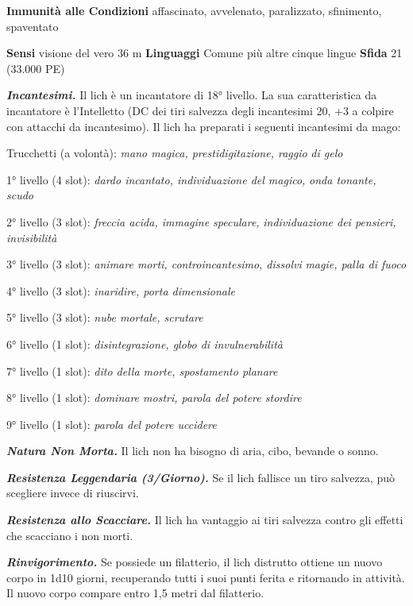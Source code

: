 \begin{multicols}{2}
\textbf{Immunità alle Condizioni} affascinato, avvelenato, paralizzato,
sfinimento, spaventato

\textbf{Sensi} visione del vero 36 m
\textbf{Linguaggi} Comune più altre cinque lingue \textbf{Sfida} 21
(33.000 PE)

\emph{\textbf{Incantesimi.}} Il lich è un incantatore di 18° livello. La
sua caratteristica da incantatore è l'Intelletto (DC dei tiri salvezza
degli incantesimi 20, +3 a colpire con attacchi da incantesimo). Il lich
ha preparati i seguenti incantesimi da mago:

Trucchetti (a volontà): \emph{mano magica, prestidigitazione, raggio}
\emph{di gelo}

1° livello (4 slot): \emph{dardo incantato, individuazione del magico,}
\emph{onda tonante, scudo}

2° livello (3 slot): \emph{freccia acida, immagine speculare,}
\emph{individuazione dei pensieri, invisibilità}

3° livello (3 slot): \emph{animare morti, controincantesimo, dissolvi}
\emph{magie, palla di fuoco}

4° livello (3 slot): \emph{inaridire, porta dimensionale}

5° livello (3 slot): \emph{nube mortale, scrutare}

6° livello (1 slot): \emph{disintegrazione, globo di invulnerabilità}

7° livello (1 slot): \emph{dito della morte, spostamento planare}

8° livello (1 slot): \emph{dominare mostri, parola del potere stordire}

9° livello (1 slot): \emph{parola del potere uccidere}

\emph{\textbf{Natura Non Morta.}} Il lich non ha bisogno di aria, cibo,
bevande o sonno.

\emph{\textbf{Resistenza Leggendaria (3/Giorno).}} Se il lich fallisce
un tiro salvezza, può scegliere invece di riuscirvi.

\emph{\textbf{Resistenza allo Scacciare.}} Il lich ha vantaggio ai tiri
salvezza contro gli effetti che scacciano i non morti.

\emph{\textbf{Rinvigorimento.}} Se possiede un filatterio, il lich
distrutto ottiene un nuovo corpo in 1d10 giorni, recuperando tutti i
suoi punti ferita e ritornando in attività. Il nuovo corpo compare entro
1,5 metri dal filatterio.


\end{multicols}

